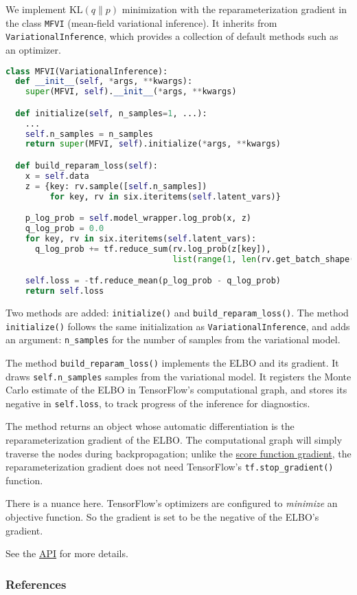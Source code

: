We implement $\text{KL}(q\|p)$ minimization with the
reparameterization gradient in the class \texttt{MFVI} (mean-field
variational inference). It inherits from
\texttt{VariationalInference}, which
provides a collection of default methods
such as an optimizer.

\begin{lstlisting}[language=Python]
class MFVI(VariationalInference):
  def __init__(self, *args, **kwargs):
    super(MFVI, self).__init__(*args, **kwargs)

  def initialize(self, n_samples=1, ...):
    ...
    self.n_samples = n_samples
    return super(MFVI, self).initialize(*args, **kwargs)

  def build_reparam_loss(self):
    x = self.data
    z = {key: rv.sample([self.n_samples])
         for key, rv in six.iteritems(self.latent_vars)}

    p_log_prob = self.model_wrapper.log_prob(x, z)
    q_log_prob = 0.0
    for key, rv in six.iteritems(self.latent_vars):
      q_log_prob += tf.reduce_sum(rv.log_prob(z[key]),
                                  list(range(1, len(rv.get_batch_shape()) + 1)))

    self.loss = -tf.reduce_mean(p_log_prob - q_log_prob)
    return self.loss
\end{lstlisting}

Two methods are added: \texttt{initialize()} and
\texttt{build_reparam_loss()}. The method \texttt{initialize()}
follows the same initialization as \texttt{VariationalInference}, and
adds an argument: \texttt{n_samples} for the number of samples from
the variational model.

The method \texttt{build_reparam_loss()} implements the ELBO and its
gradient. It draws \texttt{self.n_samples} samples from the
variational model. It registers the Monte Carlo
estimate of the ELBO in TensorFlow's computational graph, and stores
its negative in \texttt{self.loss}, to track progress of the inference for diagnostics.

The method returns an object whose automatic differentiation is the
reparameterization gradient of the ELBO. The computational graph will
simply traverse the nodes during backpropagation; unlike the
\href{/tutorials/klqp-score}{score function gradient}, the
reparameterization gradient does not need TensorFlow's
\texttt{tf.stop_gradient()} function.

There is a nuance here. TensorFlow's optimizers are configured to
\emph{minimize} an objective function. So the gradient is set to be
the negative of the ELBO's gradient.

See the \href{/api/}{API} for more details.

\subsubsection{References}\label{references}

